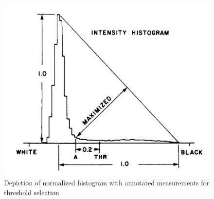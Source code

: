 \begin{figure}[h]
    \centering
    \includegraphics[scale=0.5]{figs/TriangleThresholdRef.PNG}
    \caption[Depiction of normalized histogram with annotated measurements for threshold selection]{Depiction of normalized histogram with annotated measurements for threshold selection\cite[p.742]{triangleThresh}}
    \label{fig:triangleThresh}
\end{figure}
